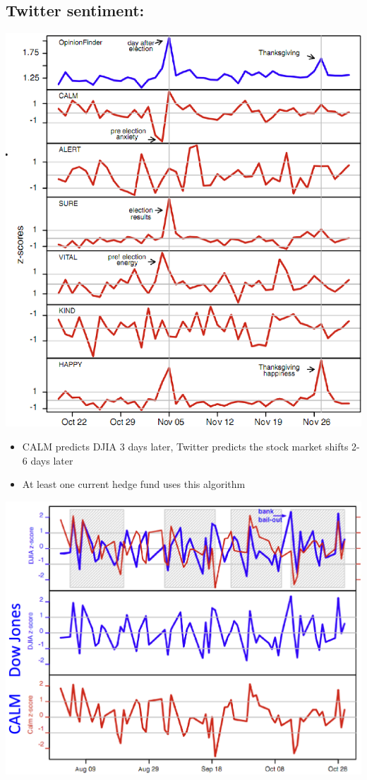 \documentclass[11pt]{article}
\theoremstyle{definition}
\begin{document}
\subsection{Twitter sentiment:}
\includegraphics[width=\textwidth/2]{8.png}
\begin{itemize}
  \item CALM predicts
  DJIA 3 days
  later, Twitter predicts the stock market shifts 2-6 days later
  \item At least one
  current hedge
  fund uses this
  algorithm
\end{itemize}
\includegraphics[width=\textwidth/2]{9.png}
\end{document}
